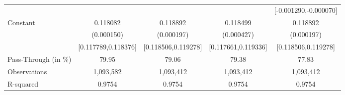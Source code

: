{\begin{tabular}{l*{4}{c}}
                    &                     &                     &                     &[-0.001290,-0.000070]         \\
Constant            &    0.118082\sym{***}&    0.118892\sym{***}&    0.118499\sym{***}&    0.118892\sym{***}\\
                    &  (0.000150)         &  (0.000197)         &  (0.000427)         &  (0.000197)         \\
                    &[0.117789,0.118376]         &[0.118506,0.119278]         &[0.117661,0.119336]         &[0.118506,0.119278]         \\
\midrule
Pass-Through (in \%)&       79.95         &       79.06         &       79.38         &       77.83         \\
Observations        &   1,093,582         &   1,093,412         &   1,093,412         &   1,093,412         \\
R-squared           &      0.9754         &      0.9754         &      0.9754         &      0.9754         \\
\bottomrule
\end{tabular}
}
